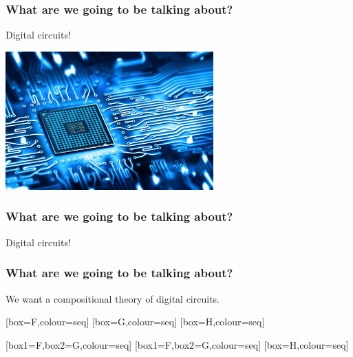 \begin{frame}
    \frametitle{What are we going to be talking about?}
    \pause
    \centering
    \LARGE
    Digital circuits!

    \includegraphics[width=0.6\textwidth]{imgs/circuit}
\end{frame}
\begin{frame}
    \frametitle{What are we going to be talking about?}
    \centering
    \LARGE
    Digital circuits!

    \vspace{1em}
    \normalsize

\end{frame}
\begin{frame}
    \frametitle{What are we going to be talking about?}

    \pause

    \centering
    \LARGE
    We want a \alert{compositional} theory of digital circuits.

    \vspace{0.5em}

    \normalsize

    \pause
    [box=F,colour=seq]
    \pause
    \quad
    [box=G,colour=seq]
    \pause
    \quad
    [box=H,colour=seq]

    \pause
    \vspace{1em}

    [box1=F,box2=G,colour=seq]
    \quad
    [box1=F,box2=G,colour=seq]
    \quad
    [box=H,colour=seq]

\end{frame}

